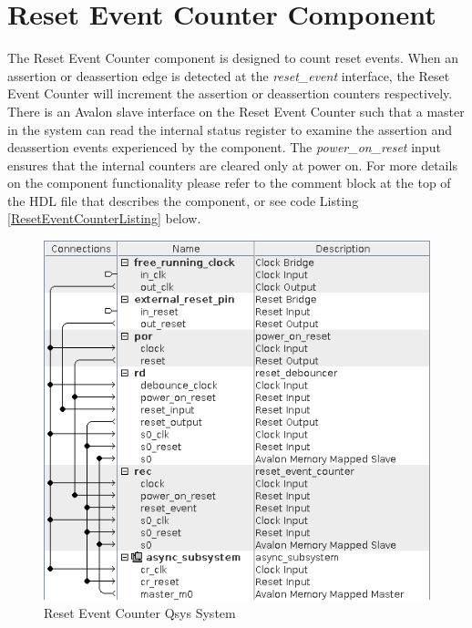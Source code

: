 \documentclass{article}
\begin{document}
\section*{Reset Event Counter Component}
\begin{flushleft}
\noindent
The Reset Event Counter component is designed to count reset events.  When an assertion or deassertion edge is detected at the \emph{reset\_event} interface, the Reset Event Counter will increment the assertion or deassertion counters respectively.  There is an Avalon slave interface on the Reset Event Counter such that a master in the system can read the internal status register to examine the assertion and deassertion events experienced by the component.  The \emph{power\_on\_reset} input ensures that the internal counters are cleared only at power on.  For more details on the component functionality please refer to the comment block at the top of the HDL file that describes the component, or see code Listing \ref{ResetEventCounterListing} below.

\begin{figure}[H]
\centering
\includegraphics[scale=0.675]{rec_qsys}
\caption{Reset Event Counter Qsys System}
\label{fig:rec_qsys}
\end{figure}


\end{flushleft}
\end{document}
